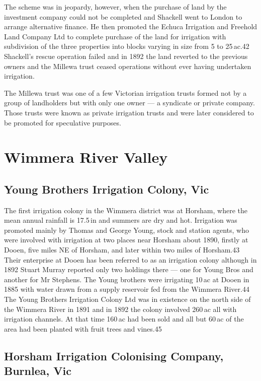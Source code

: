 The scheme was in jeopardy, however, when the purchase of land by the
investment company could not be completed and Shackell went to London
to arrange alternative finance. He then promoted the Echuca Irrigation
and Freehold Land Company Ltd to complete purchase of the land for
irrigation with subdivision of the three properties into blocks
varying in size from 5 to 25\,ac.42 Shackell's rescue operation failed
and in 1892 the land reverted to the previous owners and the Millewa
trust ceased operations without ever having undertaken irrigation.

The Millewa trust was one of a few Victorian irrigation trusts formed
not by a group of landholders but with only one owner --- a syndicate
or private company.  Those trusts were known as private irrigation
trusts and were later considered to be promoted for speculative
purposes.

\section{Wimmera River Valley}

\subsection{Young Brothers Irrigation Colony, Vic}

The first irrigation colony in the Wimmera district was at Horsham,
where the mean annual rainfall is 17.5\,in and summers are dry and
hot. Irrigation was promoted mainly by Thomas and George Young, stock
and station agents, who were involved with irrigation at two places
near Horsham about 1890, firstly at Dooen, five miles NE of Horsham,
and later within two miles of Horsham.43 Their enterprise at Dooen has
been referred to as an irrigation colony although in 1892 Stuart
Murray reported only two holdings there --- one for Young Bros and
another for Mr Stephens. The Young brothers were irrigating 10\,ac at
Dooen in 1885 with water drawn from a supply reservoir fed from the
Wimmera River.44 The Young Brothers Irrigation Colony Ltd was in
existence on the north side of the Wimmera River in 1891 and in 1892
the colony involved 260\,ac all with irrigation channels.  At that
time 160\,ac had been sold and all but 60\,ac of the area had been
planted with fruit trees and vines.45

\subsection{Horsham Irrigation Colonising Company, Burnlea, Vic}

